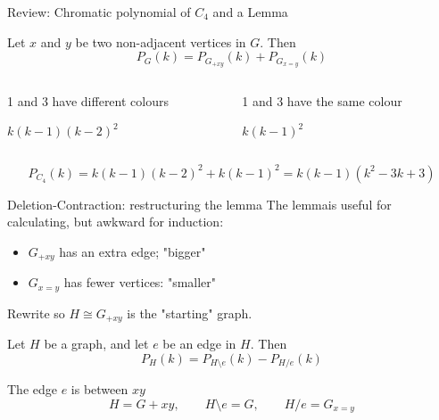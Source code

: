 \documentclass{beamer}
\begin{document}
\begin{frame}{Review: Chromatic polynomial of $C_4$ and a Lemma}  
\begin{lemma}Let $x$ and $y$ be two non-adjacent vertices in $G$.  Then 
$$P_G(k)=P_{G_{+xy}}(k)+P_{G_{x=y}}(k)$$
\end{lemma}

  \begin{columns}
     \begin{column}{.5\textwidth}
\begin{block}{1 and 3 have different colours}

  \centering
$k(k-1)(k-2)^2$
\end{block}
     \end{column}
 \begin{column}{.5\textwidth}
\begin{block}{1 and 3 have the same colour}

  \centering

$k(k-1)^2$
\end{block}
     \end{column}
  \end{columns}
$$P_{C_4}(k)=k(k-1)(k-2)^2+k(k-1)^2=k(k-1)(k^2-3k+3)$$  
  \end{frame}
\begin{frame}{Deletion-Contraction: restructuring the lemma}
The lemmais useful for calculating, but awkward for induction:
\begin{itemize}
    \item $G_{+xy}$ has an extra edge; "bigger"
    \item $G_{x=y}$ has fewer vertices: "smaller"
\end{itemize}
Rewrite so $H\cong G_{+xy}$ is the "starting" graph.
\begin{lemma}
Let $H$ be a graph, and let $e$ be an edge in $H$.  Then
$$P_H(k)=P_{H\setminus e}(k)-P_{H/e}(k)$$
\end{lemma}  
The edge $e$ is between $xy$
$$H=G+xy,\qquad H\setminus e=G,\qquad H/e=G_{x=y}$$

\end{frame}  
\end{document}
